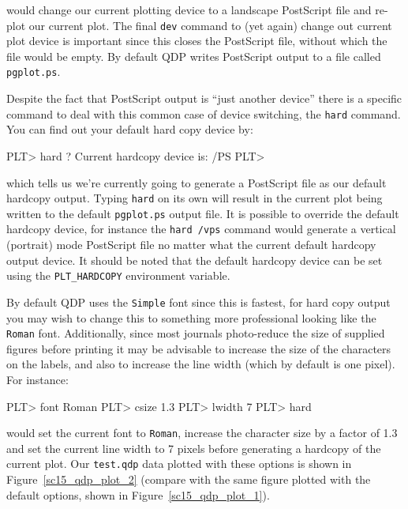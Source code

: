 \documentclass[twoside,11pt]{starlink}
\begin{document}
would change our current plotting device to a landscape PostScript
file and re-plot our current plot. The final \texttt{dev} command to (yet
again) change out current plot device is important since this closes
the PostScript file, without which the file would be empty. By default
QDP writes PostScript output to a file called \texttt{pgplot.ps}.

Despite the fact that PostScript output is ``just another device''
there is a specific command to deal with this common case of device
switching, the \texttt{hard} command. You can find out your default hard
copy device by:

\begin{small}
\begin{terminalv}
PLT> hard ?
 Current hardcopy device is: /PS
PLT>
\end{terminalv}
\end{small}

which tells us we're currently going to generate a PostScript file as
our default hardcopy output. Typing \texttt{hard} on its own will result
in the current plot being written to the default \texttt{pgplot.ps}
output file. It is possible to override the default hardcopy device,
for instance the \texttt{hard /vps} command would generate a vertical
(portrait) mode PostScript file no matter what the current default
hardcopy output device. It should be noted that the default hardcopy
device can be set using the \texttt{PLT\_HARDCOPY} environment variable.

By default QDP uses the \texttt{Simple} font since this is fastest, for
hard copy output you may wish to change this to something more
professional looking like the \texttt{Roman} font. Additionally, since
most journals photo-reduce the size of supplied figures before
printing it may be advisable to increase the size of the characters on
the labels, and also to increase the line width (which by default is
one pixel). For instance:

\begin{small}
\begin{terminalv}
PLT> font Roman
PLT> csize 1.3
PLT> lwidth 7
PLT> hard
\end{terminalv}
\end{small}

would set the current font to \texttt{Roman}, increase the character size
by a factor of 1.3 and set the current line width to 7 pixels before
generating a hardcopy of the current plot. Our \texttt{test.qdp} data
plotted with these options is shown in Figure~\ref{sc15_qdp_plot_2}
(compare with the same figure plotted with the default options, shown
in Figure~\ref{sc15_qdp_plot_1}).
\end{document}
